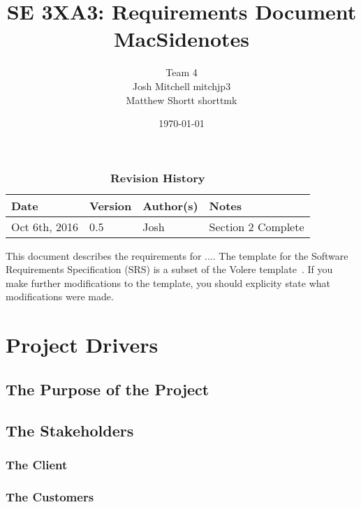 \documentclass[12pt, titlepage]{article}
\title{SE 3XA3: Requirements Document\\MacSidenotes}
\author{Team 4
		\\ Josh Mitchell mitchjp3
		\\ Matthew Shortt shorttmk
}
\date{\today}
\begin{document}
\maketitle

\tableofcontents
\listoftables
\listoffigures



\begin{table}[bp]
\caption{\bf Revision History}
\begin{tabularx}{\textwidth}{p{3cm}p{2cm}p{2cm}X}
\toprule {\bf Date} & {\bf Version} & {\bf Author(s)} & {\bf Notes}\\
\midrule
Oct 6th, 2016 & 0.5 & Josh & Section 2 Complete\\
\bottomrule
\end{tabularx}
\end{table}

\newpage



This document describes the requirements for ....  The template for the Software
Requirements Specification (SRS) is a subset of the Volere
template~\citep{RobertsonAndRobertson2012}.  If you make further modifications
to the template, you should explicity state what modifications were made.

\section{Project Drivers}

\subsection{The Purpose of the Project}

\subsection{The Stakeholders}

\subsubsection{The Client}

\subsubsection{The Customers}
\end{document}
